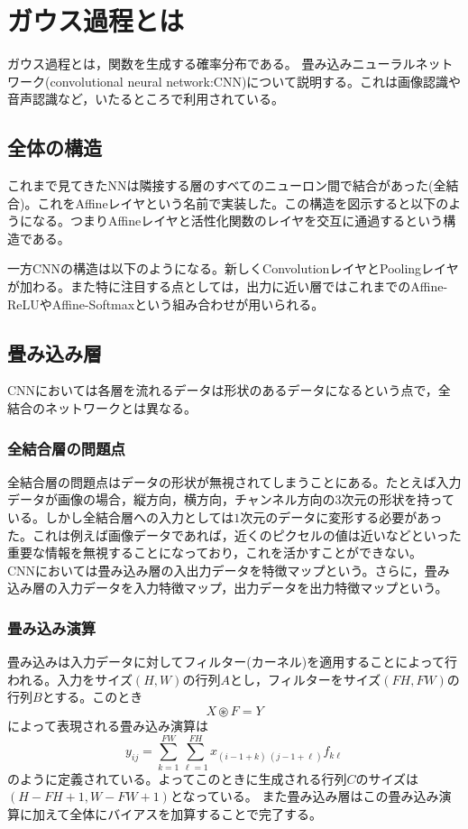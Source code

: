 \documentclass{jarticle}
\begin{document}
\setcounter{section}{0}
\section{ガウス過程とは}
ガウス過程とは，関数を生成する確率分布である。
畳み込みニューラルネットワーク(convolutional neural network:CNN)について説明する。これは画像認識や音声認識など，いたるところで利用されている。
\subsection{全体の構造}
これまで見てきたNNは隣接する層のすべてのニューロン間で結合があった(全結合)。これをAffineレイヤという名前で実装した。この構造を図示すると以下のようになる。つまりAffineレイヤと活性化関数のレイヤを交互に通過するという構造である。\\
\scalebox{0.6}{}

一方CNNの構造は以下のようになる。新しくConvolutionレイヤとPoolingレイヤが加わる。また特に注目する点としては，出力に近い層ではこれまでのAffine-ReLUやAffine-Softmaxという組み合わせが用いられる。
\scalebox{0.6}{}

\subsection{畳み込み層}
CNNにおいては各層を流れるデータは形状のあるデータになるという点で，全結合のネットワークとは異なる。
\subsubsection{全結合層の問題点}
全結合層の問題点はデータの形状が無視されてしまうことにある。たとえば入力データが画像の場合，縦方向，横方向，チャンネル方向の$3$次元の形状を持っている。しかし全結合層への入力としては$1$次元のデータに変形する必要があった。これは例えば画像データであれば，近くのピクセルの値は近いなどといった重要な情報を無視することになっており，これを活かすことができない。\\
CNNにおいては畳み込み層の入出力データを特徴マップという。さらに，畳み込み層の入力データを入力特徴マップ，出力データを出力特徴マップという。
\subsubsection{畳み込み演算}
畳み込みは入力データに対してフィルター(カーネル)を適用することによって行われる。入力をサイズ$(H,W)$の行列$A$とし，フィルターをサイズ$(FH,FW)$の行列$B$とする。このとき
\[
X \circledast F = Y
\]
によって表現される畳み込み演算は
\[
y_{ij} = \sum_{k=1}^{FW} \sum_{\ell = 1}^{FH} x_{(i-1+k)~(j-1+\ell)} f_{k\ell}
\]
のように定義されている。よってこのときに生成される行列$C$のサイズは$(H-FH+1,W-FW+1)$となっている。
また畳み込み層はこの畳み込み演算に加えて全体にバイアスを加算することで完了する。
\end{document}
